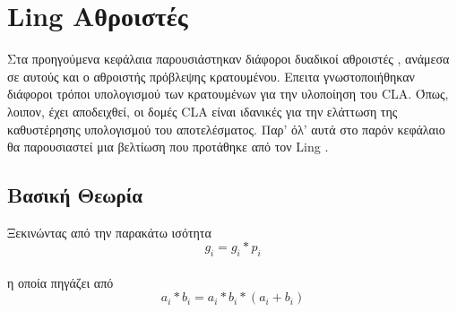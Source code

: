 \section{Ling Αθροιστές}
Στα προηγούμενα κεφάλαια παρουσιάστηκαν διάφοροι δυαδικοί αθροιστές , 
ανάμεσα σε αυτούς και ο αθροιστής πρόβλεψης κρατουμένου. Επειτα γνωστοποιήθηκαν 
διάφοροι τρόποι υπολογισμού των κρατουμένων για την υλοποίηση του CLA. Όπως, λοιπον,
έχει αποδειχθεί, οι δομές CLA είναι ιδανικές για την ελάττωση της καθυστέρησης υπολογισμού
του αποτελέσματος. Παρ' όλ' αυτά στο παρόν κεφάλαιο θα παρουσιαστεί μια βελτίωση που προτάθηκε 
από τον Ling \cite{ling}.



\subsection{Βασική Θεωρία}

Ξεκινώντας από την παρακάτω ισότητα 
\begin{equation}
    g_i = g_i*p_i
\end{equation}
\\
η οποία πηγάζει από 
\begin{equation*}
    a_i * b_i = a_i * b_i * (a_i + b_i)
\end{equation*}

